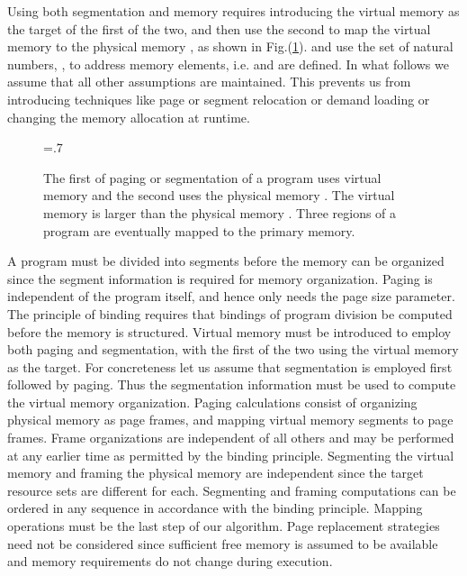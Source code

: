 \documentclass[draft]{article}
\def\figdir{.}
\begin{document}
Using both  segmentation and  memory requires introducing  the virtual
memory  as the target of  the first of the two, and then use
the second to map the virtual memory  to the physical memory
,  as   shown  in  Fig.(\ref{fig:paging:segmentation}).      and
 use  the set of  natural numbers, ,  to address
memory elements,  i.e.  and   are defined.   In  what
follows  we assume that  all other  assumptions are  maintained.  This
prevents  us   from  introducing  techniques  like   page  or  segment
relocation  or demand  loading or  changing the  memory  allocation at
runtime.
\begin{figure}[ht]
  \centering
  \epsfxsize=.7\textwidth
  \epsffile{\figdir/pg-seg-algo-2.eps}
  \caption[Paging   and   Segmentation]{The   first   of   paging   or
    segmentation of a program  uses virtual memory  and
    the  second uses  the  physical memory  .   The virtual  memory
     is larger than  the physical memory .  Three regions
    of a program  are eventually mapped to the primary memory.}
  \label{fig:paging:segmentation}
\end{figure}

A  program must  be divided  into segments  before the  memory  can be
organized  since  the  segment  information  is  required  for  memory
organization.  Paging is independent  of the program itself, and hence
only needs the page size parameter.  The principle of binding requires
that bindings  of program  division be computed  before the  memory is
structured.  Virtual  memory must be introduced to  employ both paging
and segmentation, with  the first of the two  using the virtual memory
as the  target.  For concreteness  let us assume that  segmentation is
employed first followed by  paging.  Thus the segmentation information
must  be used  to  compute the  virtual  memory organization.   Paging
calculations consist of organizing physical memory as page frames, and
mapping virtual  memory segments to page  frames.  Frame organizations
are independent of all others and may be performed at any earlier time
as permitted by the  binding principle.  Segmenting the virtual memory
and  framing the  physical  memory are  independent  since the  target
resource  sets  are  different   for  each.   Segmenting  and  framing
computations can  be ordered  in any sequence  in accordance  with the
binding principle.   Mapping operations must  be the last step  of our
algorithm.  Page  replacement strategies need not  be considered since
sufficient  free  memory  is   assumed  to  be  available  and  memory
requirements do not change during execution.
\end{document}
